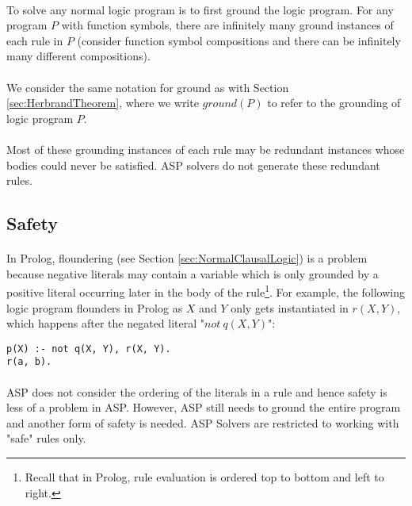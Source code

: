 \documentclass{article}
\theoremstyle{plain}
\theoremstyle{definition}
\begin{document}
\begin{multicols}{2}
\paragraph{} To solve any normal logic program is to first ground the logic program. For any program $P$ with function symbols, there are infinitely many ground instances of each rule in $P$ (consider function symbol compositions and there can be infinitely many different compositions).

\paragraph{} We consider the same notation for ground as with Section \ref{sec:HerbrandTheorem}, where we write $ground(P)$ to refer to the grounding of logic program $P$.

\paragraph{} Most of these grounding instances of each rule may be redundant instances whose bodies could never be satisfied. ASP solvers do not generate these redundant rules.

\subsection{Safety}

\paragraph{} In Prolog, floundering (see Section \ref{sec:NormalClausalLogic}) is a problem because negative literals may contain a variable which is only grounded by a positive literal occurring later in the body of the rule\footnote{Recall that in Prolog, rule evaluation is ordered top to bottom and left to right.}. For example, the following logic program flounders in Prolog as $X$ and $Y$ only gets instantiated in $r(X, Y)$, which happens after the negated literal "$not\ q(X, Y)$":

\begin{lstlisting}
p(X) :- not q(X, Y), r(X, Y).
r(a, b).
\end{lstlisting}

\paragraph{} ASP does not consider the ordering of the literals in a rule and hence safety is less of a problem in ASP.  However, ASP still needs to ground the entire program and another form of safety is needed. ASP Solvers are restricted to working with "safe" rules only.


\end{multicols}
\end{document}
